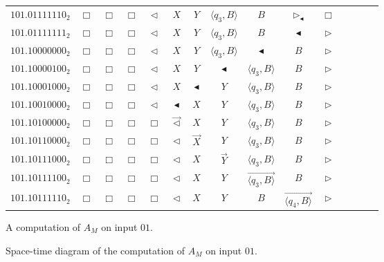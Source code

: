 \documentclass[pre,showpacs,showkeys,preprint]{revtex4}
\theoremstyle{definition}
\begin{document}
\begin{figure}
\begin{center}
{\begin{tabular}{r|cccccccccccccc}
$101.01111110_2$ & $\Box$ & $\Box$ & $\Box$ & $\lhd$ & $X$ & $Y$ & $\langle q_3,B \rangle$ & $B$ & $\rhd_\blacktriangleleft$ & $\Box$ \\
$101.01111111_2$ & $\Box$ & $\Box$ & $\Box$ & $\lhd$ & $X$ & $Y$ & $\langle q_3,B \rangle$ & $B$ & $\blacktriangleleft$ & $\rhd$ \\
$101.10000000_2$ & $\Box$ & $\Box$ & $\Box$ & $\lhd$ & $X$ & $Y$ & $\langle q_3,B \rangle$ & $\blacktriangleleft$ & $B$ & $\rhd$ \\
$101.10000100_2$ & $\Box$ & $\Box$ & $\Box$ & $\lhd$ & $X$ & $Y$ & $\blacktriangleleft$ & $\langle q_3,B \rangle$ & $B$ & $\rhd$ \\
$101.10001000_2$ & $\Box$ & $\Box$ & $\Box$ & $\lhd$ & $X$ & $\blacktriangleleft$ & $Y$ & $\langle q_3,B \rangle$ & $B$ & $\rhd$ \\
$101.10010000_2$ & $\Box$ & $\Box$ & $\Box$ & $\lhd$ & $\blacktriangleleft$ & $X$ & $Y$ & $\langle q_3,B \rangle$ & $B$ & $\rhd$ \\
$101.10100000_2$ & $\Box$ & $\Box$ & $\Box$ & $\Box$ & $\overrightarrow{\lhd}$ & $X$ & $Y$ & $\langle q_3,B \rangle$ & $B$ & $\rhd$ \\
$101.10110000_2$ & $\Box$ & $\Box$ & $\Box$ & $\Box$ & $\lhd$ & $\overrightarrow{X}$ & $Y$ & $\langle q_3,B \rangle$ & $B$ & $\rhd$ \\
$101.10111000_2$ & $\Box$ & $\Box$ & $\Box$ & $\Box$ & $\lhd$ & $X$ & $\overrightarrow{Y}$ & $\langle q_3,B \rangle$ & $B$ & $\rhd$ \\
$101.10111100_2$ & $\Box$ & $\Box$ & $\Box$ & $\Box$ & $\lhd$ & $X$ & $Y$ & $\overrightarrow{\langle q_3,B \rangle}$ & $B$ & $\rhd$ \\
$101.10111110_2$ & $\Box$ & $\Box$ & $\Box$ & $\Box$ & $\lhd$ & $X$ & $Y$ & $B$ & $\overrightarrow{\langle q_4,B \rangle}$ & $\rhd$ \\
\end{tabular}
}
\end{center}
\caption{\label{fig:example-hyper-sca-2}A computation of $A_M$ on input $01$.}
\end{figure}


\begin{figure}
\begin{center}
\caption{\label{fig:evolution} Space-time diagram of the computation of $A_M$ on input $01$.}
\end{center}
\end{figure}
\end{document}
